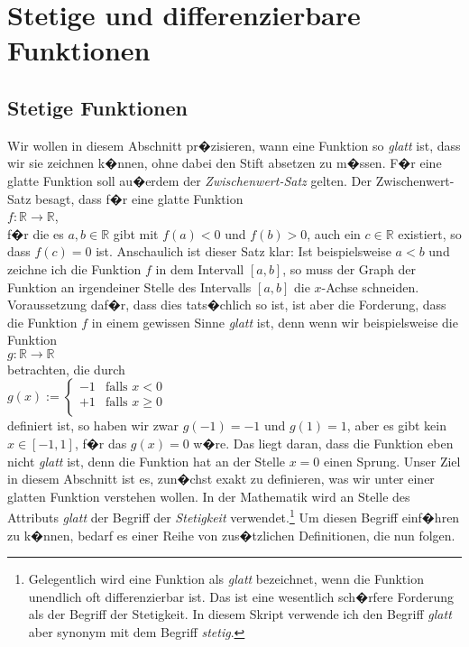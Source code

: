 \chapter{Stetige und differenzierbare Funktionen}
\section{Stetige Funktionen}
Wir wollen in diesem Abschnitt pr�zisieren, wann eine Funktion so \emph{glatt} ist, dass
wir sie zeichnen k�nnen, ohne dabei den Stift absetzen zu m�ssen.  F�r eine glatte Funktion soll au�erdem der
\emph{Zwischenwert-Satz} gelten.  Der Zwischenwert-Satz besagt, dass f�r eine glatte Funktion
\\[0.2cm]
\hspace*{1.3cm}
$f: \mathbb{R} \rightarrow \mathbb{R}$,
\\[0.2cm]
f�r die es $a,b \in \mathbb{R}$ gibt mit $f(a) < 0$ und $f(b) > 0$, auch ein $c \in \mathbb{R}$
existiert, so dass $f(c) = 0$ ist.  Anschaulich ist dieser Satz klar:  Ist beispielsweise $a < b$ und
zeichne ich die Funktion $f$ in dem Intervall $[a, b]$, so muss der Graph der Funktion an irgendeiner
Stelle des Intervalls $[a,b]$ die $x$-Achse schneiden.  Voraussetzung daf�r, dass dies tats�chlich so
ist, ist aber die Forderung, dass die Funktion $f$ in einem gewissen Sinne \emph{glatt} ist, denn wenn wir
beispielsweise die Funktion 
\\[0.2cm]
\hspace*{1.3cm}
$g: \mathbb{R} \rightarrow \mathbb{R}$
\\[0.2cm]
betrachten, die durch 
\\[0.2cm]
\hspace*{1.3cm}
$g(x) := \left\{
 \begin{array}{ll}
 -1 & \mbox{falls $x <    0$} \\ 
 +1 & \mbox{falls $x \geq 0$} \\ 
 \end{array}
 \right.
$
\\[0.2cm]
definiert ist, so haben wir zwar  $g(-1) = -1$ und $g(1) = 1$, aber es gibt kein $x \in [-1,1]$, 
f�r das $g(x) = 0$ w�re.   Das liegt daran, dass die Funktion eben nicht \emph{glatt} ist, denn die
Funktion hat an der Stelle $x = 0$ einen Sprung.  Unser Ziel in diesem Abschnitt ist es, zun�chst exakt zu
definieren, was wir unter einer glatten Funktion verstehen wollen.  In der Mathematik wird an Stelle des
Attributs \emph{glatt} der Begriff der \emph{Stetigkeit} verwendet.\footnote{
Gelegentlich wird eine Funktion  als \emph{glatt} bezeichnet, wenn die Funktion unendlich oft
differenzierbar ist.  Das ist eine wesentlich sch�rfere Forderung als der Begriff der Stetigkeit.
In diesem Skript verwende ich den Begriff \emph{glatt} aber synonym mit dem Begriff \emph{stetig}.}
Um diesen Begriff einf�hren zu k�nnen,
bedarf es einer Reihe von zus�tzlichen Definitionen, die nun folgen.


